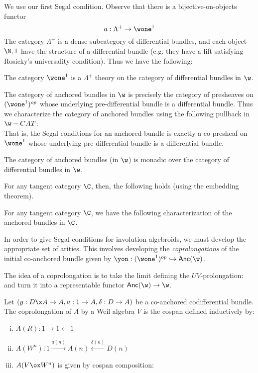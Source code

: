 We use our first Segal condition. Observe that there is a bijective-on-objects functor
\[
    a: \Lambda^+ \to \wone^1
\]
The category $\Lambda^+$ is a dense subcategory of differential bundles, and each object $\N, 1$ have the structure of a differential bundle (e.g. they have a lift satisfying Rosicky's universality condition).
Thus we have the following:
\begin{lemma}
    The category $\wone^1$ is a $\Lambda^+$ theory on the category of differential bundles in $\w$.
\end{lemma}
The category of anchored bundles in $\w$ is precisely the category of presheaves on $(\wone^{1})^{op}$ whose underlying pre-differential bundle is a differential bundle. Thus we characterize the category of anchored bundles using the following pullback in $\w-CAT$:
\[\]
That is, the Segal conditions for an anchored bundle is exactly a co-presheaf on $\wone^1$ whose underlying pre-differential bundle is a differential bundle.
\begin{proposition}
    The category of anchored bundles (in $\w$) is monadic over the category of differential bundles in $\w$.
\end{proposition}
For any tangent category $\C$, then, the following holds (using the embedding theorem).
\begin{corollary}
    For any tangent category $\C$, we have the following characterization of the anchored bundles in $\C$.
    \[\]
\end{corollary}


In order to give Segal conditions for involution algebroids, we must develop the appropriate set of arities.
This involves developing the \emph{coprolongations} of the initial co-anchored bundle given by $\yon: (\wone^1)^{op} \hookrightarrow \mathsf{Anc}(\w)$.

The idea of a coprolongation is to take the limit defining the $UV$-prolongation:
\[\]
and turn it into a representable functor $\mathsf{Anc}(\w) \to \w$.

\begin{definition}
    Let $(y:D \x A \to A, a:1 \to A, \delta: D \to A)$ be a co-anchored codifferential bundle. The coprolongation of $A$ by a Weil algebra $V$ is the cospan defined inductively by:
    \begin{enumerate}[(i)]
        \item $A(R): 1 \xrightarrow{=} 1 \xleftarrow{=} 1$
        \item $A(W^n):1 \xrightarrow{a(n)} A(n) \xleftarrow{\delta(n)} D(n)$
        \item $A(V \ox W^n)$ is given by cospan composition:
        
    \end{enumerate}
\end{definition}

